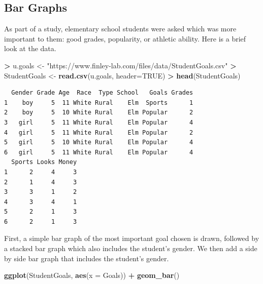 \documentclass[
]{krantz}
\makeatletter
\newenvironment{Shaded}{\begin{snugshade}}{\end{snugshade}}
\newcommand{\DataTypeTok}[1]{\textcolor[rgb]{0.27,0.27,0.27}{#1}}
\newcommand{\KeywordTok}[1]{\textcolor[rgb]{0.27,0.27,0.27}{\textbf{#1}}}
\newcommand{\NormalTok}[1]{#1}
\newcommand{\OperatorTok}[1]{\textcolor[rgb]{0.43,0.43,0.43}{\textbf{#1}}}
\newcommand{\OtherTok}[1]{\textcolor[rgb]{0.37,0.37,0.37}{#1}}
\newcommand{\StringTok}[1]{\textcolor[rgb]{0.5,0.5,0.5}{#1}}
\newenvironment{kframe}{%
\medskip{}
\setlength{\fboxsep}{.8em}
 \def\at@end@of@kframe{}%
 \ifinner\ifhmode%
  \def\at@end@of@kframe{\end{minipage}}%
  \begin{minipage}{\columnwidth}%
 \fi\fi%
 \def\FrameCommand##1{\hskip\@totalleftmargin \hskip-\fboxsep
 \colorbox{shadecolor}{##1}\hskip-\fboxsep
     \hskip-\linewidth \hskip-\@totalleftmargin \hskip\columnwidth}%
 \MakeFramed {\advance\hsize-\width
   \@totalleftmargin\z@ \linewidth\hsize
   \@setminipage}}%
 {\par\unskip\endMakeFramed%
 \at@end@of@kframe}
\renewenvironment{Shaded}{\begin{kframe}}{\end{kframe}}
\makeatother
\begin{document}
\hypertarget{bar-graphs}{%
\subsection{Bar Graphs}\label{bar-graphs}}

As part of a study, elementary school students were asked which was more important to them: good grades, popularity, or athletic ability. Here is a brief look at the data.

\begin{Shaded}
\begin{Highlighting}[]
\OperatorTok{\textgreater{}}\StringTok{ }\NormalTok{u.goals \textless{}{-}}\StringTok{ "https://www.finley{-}lab.com/files/data/StudentGoals.csv"}
\OperatorTok{\textgreater{}}\StringTok{ }\NormalTok{StudentGoals \textless{}{-}}\StringTok{ }\KeywordTok{read.csv}\NormalTok{(u.goals, }\DataTypeTok{header=}\OtherTok{TRUE}\NormalTok{)}
\OperatorTok{\textgreater{}}\StringTok{ }\KeywordTok{head}\NormalTok{(StudentGoals)}
\end{Highlighting}
\end{Shaded}

\begin{verbatim}
  Gender Grade Age  Race  Type School   Goals Grades
1    boy     5  11 White Rural    Elm  Sports      1
2    boy     5  10 White Rural    Elm Popular      2
3   girl     5  11 White Rural    Elm Popular      4
4   girl     5  11 White Rural    Elm Popular      2
5   girl     5  10 White Rural    Elm Popular      4
6   girl     5  11 White Rural    Elm Popular      4
  Sports Looks Money
1      2     4     3
2      1     4     3
3      3     1     2
4      3     4     1
5      2     1     3
6      2     1     3
\end{verbatim}

First, a simple bar graph of the most important goal chosen is drawn, followed by a stacked bar graph which also includes the student's gender. We then add a side by side bar graph that includes the student's gender.

\begin{Shaded}
\begin{Highlighting}[]
\KeywordTok{ggplot}\NormalTok{(StudentGoals, }\KeywordTok{aes}\NormalTok{(}\DataTypeTok{x =}\NormalTok{ Goals)) }\OperatorTok{+}\StringTok{ }\KeywordTok{geom\_bar}\NormalTok{()}
\end{Highlighting}
\end{Shaded}
\end{document}
